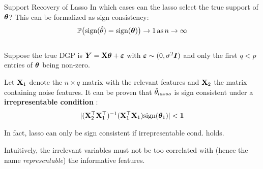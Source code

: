 \documentclass[11pt,compress,t,notes=noshow, xcolor=table]{beamer}
\begin{document}
\begin{vbframe}{Support Recovery of Lasso}
In which cases can the lasso select the true support of $\bm{\theta}$? This can be formalized as sign consistency: 
\begin{align*}
\mathbb{P}\big(\text{sign}(\hat{\theta})=\text{sign}(\bm{\theta})\big) \to 1 \, \text{as} \, n \to \infty
\end{align*}
\\
Suppose the true DGP is $\bm{Y}=\mathbf{X}\bm{\theta} + \bm{\varepsilon}$ with $\bm{\varepsilon}\sim (0,\sigma^2 \boldsymbol{I})$ and only the first $q<p$ entries of $\bm{\theta}$ being non-zero. 
\vspace{0.1cm}

Let $\mathbf{X}_1$ denote the $n \times q$ matrix with the relevant features and $\mathbf{X}_2$ the matrix containing noise features. It can be proven that $\hat{\theta}_{lasso}$ is sign consistent under a \textbf{irrepresentable condition} :
\begin{align*}
    \vert (\Xmat_2^{\top} \Xmat_1^{\top})^{-1} (\Xmat_1^{\top} \Xmat_1) \text{sign}(\thetab_1)\vert < \bm{1} %
\end{align*}

In fact, lasso can only be sign consistent if irrepresentable cond. holds.

Intuitively, the irrelevant variables must not be too correlated with (hence the name \textit{representable}) the informative features.

\end{vbframe}

\endlecture
\end{document}
